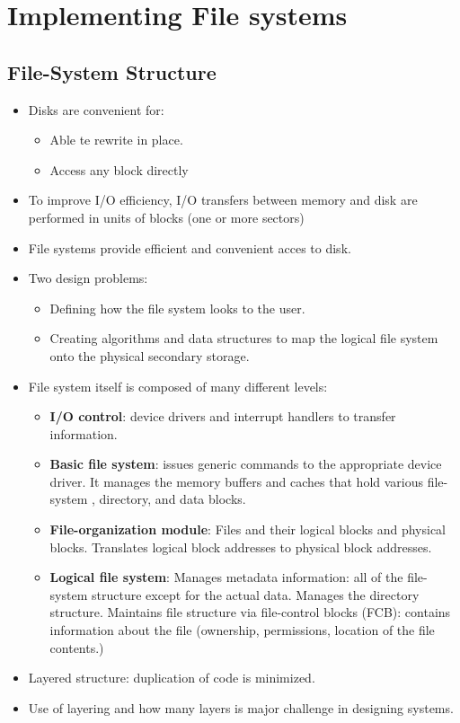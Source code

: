 \documentclass[10pt]{report}
\begin{document}
\chapter{Implementing File systems} \label{ch:Chapter11}
	\section{File-System Structure}
		\begin{itemize}
				\item Disks are convenient for:
				\begin{itemize}
						\item Able te rewrite in place.
						\item Access any block directly
				\end{itemize}
				\item To improve I/O efficiency, I/O transfers between memory and disk are performed in units of blocks (one or more sectors)
				\item File systems provide efficient and convenient acces to disk.
				\item Two design problems:
				\begin{itemize}
						\item Defining how the file system looks to the user.
						\item Creating algorithms and data structures to map the logical file system onto the physical secondary storage.
				\end{itemize}
				\item File system itself is composed of many different levels:
				\begin{itemize}
						\item \textbf{I/O control}: device drivers and interrupt handlers to transfer information.
						\item \textbf{Basic file system}: issues generic commands to the appropriate device driver. It manages the memory buffers and caches that hold various file-system , directory, and data blocks.
						\item \textbf{File-organization module}: Files and their logical blocks and physical blocks. Translates logical block addresses to physical block addresses.
						\item \textbf{Logical file system}: Manages metadata information: all of the file-system structure except for the actual data. Manages the directory structure. Maintains file structure via file-control blocks (FCB): contains information about the file (ownership, permissions, location of the file contents.)
				\end{itemize}
				\item Layered structure: duplication of code is minimized.
				\item Use of layering and how  many layers is major challenge in designing systems.
		\end{itemize}
\end{document}
